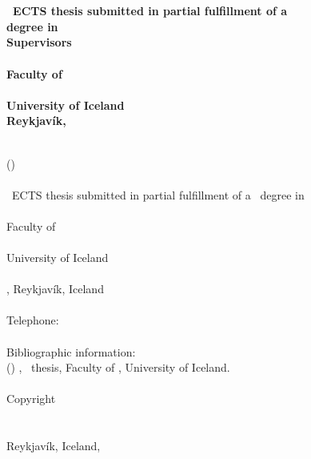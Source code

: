 \begin{titlepage}
  \newpage
  \thispagestyle{empty}\mbox{}
  \newpage
  \thispagestyle{empty}
  \begin{center}
    \Large \sffamily \bfseries \thesistitle{}
    \normalfont \large \sffamily \thesissubtitle{}\\
    \sffamily{\thesisauthor{}}\\
    \normalsize \thesiscredits{}~ECTS thesis submitted in partial fulfillment of a \\
    \textit{\thesiskindformal{}} degree in \thesissubject{}\\
    \large
    \ifx\thesissupervisors\empty\else
      Supervisors \\
      \thesissupervisors{} \\
    \fi
    Faculty of \thesisfaculty \\
    \thesisschool \\
    University of Iceland \\
    Reykjavík, \thesismonth~\thesisyear
  \end{center}

  \newpage
  \thispagestyle{empty}
  \vspace*{\fill}
  \sffamily{\removelinebreaks{\thesistitle}} \\
  \ifx\thesisshorttitle\empty\else
      (\sffamily{\thesisshorttitle{}}) \\\\
  \fi
  \thesiscredits{}~ECTS thesis submitted in partial fulfillment of a
  \thesiskind{}~degree in \thesissubject{} \\\\
  Faculty of \thesisfaculty \\
  \thesisschool \\
  University of Iceland \\
  \thesisaddress \\
  \thesispostalcode, Reykjavík, Iceland \\\\
  Telephone: \thesistelephone \\\\
  \vspace{\lineskip}
  Bibliographic information: \\
  \thesisauthor{} (\thesisyear{}) \emph{\removelinebreaks{\thesistitle{}}},
  \thesiskind{}~thesis, Faculty of \thesisfaculty, University of Iceland. \\\\
  Copyright \textcopyright~\thesisyear~\thesisauthor \\
  \thesislicense{} \\\\
  Reykjavík, Iceland, \thesismonth~\thesisyear

  \newpage
  \thispagestyle{empty}\mbox{}
\end{titlepage}
